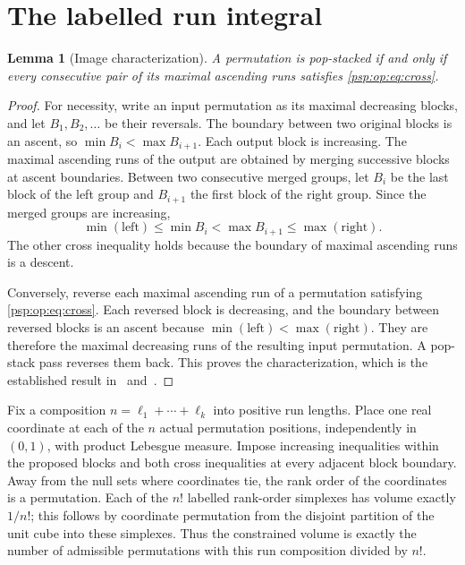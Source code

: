 \documentclass[11pt,letterpaper]{article}
\numberwithin{equation}{section}
\newtheorem{lemma}[theorem]{Lemma}
\theoremstyle{remark}\newtheorem{remark}[theorem]{Remark}
\begin{document}
\section{The labelled run integral}\label{psp:op:sec:integral}
\begin{lemma}[Image characterization]\label{psp:op:lem:characterization}
A permutation is pop-stacked if and only if every consecutive pair
of its maximal ascending runs satisfies \eqref{psp:op:eq:cross}.
\end{lemma}
\begin{proof}
For necessity, write an input permutation as its maximal decreasing
blocks, and let $B_1,B_2,\ldots$ be their reversals. The boundary between
two original blocks is an ascent, so
$\min B_i<\max B_{i+1}$. Each output block is increasing.
The maximal ascending runs of the output are obtained by merging
successive blocks at ascent boundaries. Between two consecutive
merged groups, let $B_i$ be the last block of the left group and
$B_{i+1}$ the first block of the right group. Since the merged groups
are increasing,
\[
 \min(\text{left})\leq\min B_i<\max B_{i+1}
 \leq\max(\text{right}).
\]
The other cross inequality holds because the boundary of maximal
ascending runs is a descent.

Conversely, reverse each maximal ascending run of a permutation
satisfying \eqref{psp:op:eq:cross}. Each reversed block is decreasing, and
the boundary between reversed blocks is an ascent because
$\min(\text{left})<\max(\text{right})$. They are therefore the maximal
decreasing runs of the resulting input permutation. A pop-stack pass
reverses them back. This proves the characterization, which is the
established result in~\cite[Theorem 1]{abbhl} and~\cite[Theorem 3]{abh}.
\end{proof}

Fix a composition $n=\ell_1+\cdots+\ell_k$ into positive run lengths.
Place one real coordinate at each of the $n$ actual permutation
positions, independently in $(0,1)$, with product Lebesgue measure.
Impose increasing inequalities within the proposed blocks and both
cross inequalities at every adjacent block boundary. Away from the
null sets where coordinates tie, the rank order of the coordinates
is a permutation. Each of the $n!$ labelled rank-order simplexes has
volume exactly $1/n!$; this follows by coordinate permutation from
the disjoint partition of the unit cube into these simplexes.
Thus the constrained volume is exactly the number of admissible
permutations with this run composition divided by $n!$.
\end{document}
